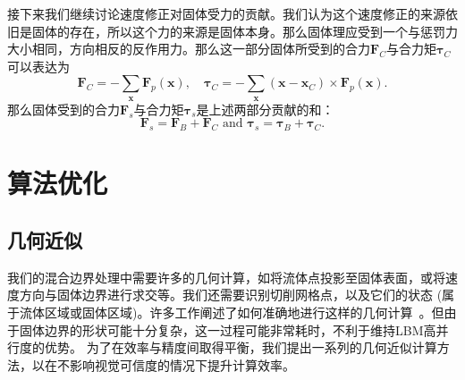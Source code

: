 接下来我们继续讨论速度修正对固体受力的贡献。我们认为这个速度修正的来源依旧是固体的存在，所以这个力的来源是固体本身。那么固体理应受到一个与惩罚力大小相同，方向相反的反作用力。那么这一部分固体所受到的合力$\bm{F}_{C}$与合力矩$\bm{\tau}_{C}$可以表达为
\begin{equation}
\bm{F}_{C} = - \sum_{\bm{x}}\bm{F}_p(\bm{x}), \quad \bm{\tau}_{C} = - \sum_{\bm{x}} (\bm{x}-\bm{x}_{C})\times\bm{F}_p(\bm{x}).
\end{equation}
那么固体受到的合力$\bm{F}_s$与合力矩$\bm{\tau}_s$是上述两部分贡献的和：
\begin{equation}
\bm{F}_s = \bm{F}_{B} + \bm{F}_{C} \text{ and } \bm{\tau}_s = \bm{\tau}_{B} + \bm{\tau}_{C}.
\end{equation}

\section{算法优化}
\subsection{几何近似}
我们的混合边界处理中需要许多的几何计算，如将流体点投影至固体表面，或将速度方向与固体边界进行求交等。我们还需要识别切削网格点，以及它们的状态 (属于流体区域或固体区域)。许多工作阐述了如何准确地进行这样的几何计算~\cite{Azevedo-2016,Robinson:2009}。但由于固体边界的形状可能十分复杂，这一过程可能非常耗时，不利于维持LBM高并行度的优势。
为了在效率与精度间取得平衡，我们提出一系列的几何近似计算方法，以在不影响视觉可信度的情况下提升计算效率。

